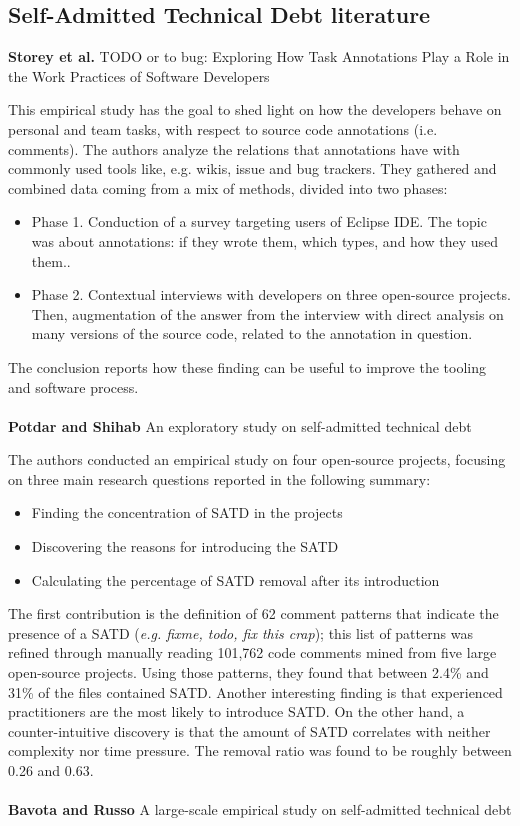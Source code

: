 \subsection{Self-Admitted Technical Debt literature}
\textbf{Storey et al.} \cite{storey2008todo} TODO or to bug: Exploring How Task Annotations Play a Role in the Work Practices of Software Developers

This empirical study has the goal to shed light on how the developers behave on personal and team tasks, with respect to source code annotations (i.e. comments).
The authors analyze the relations that annotations have with commonly used tools like, e.g. wikis, issue and bug trackers. They gathered and combined data coming from a mix of methods, divided into two phases:
\begin{itemize}
    \item Phase 1. Conduction of a survey targeting users of Eclipse IDE. The topic was about annotations: if they wrote them, which types, and how they used them..
    \item Phase 2. Contextual interviews with developers on three open-source projects. Then, augmentation of the answer from the interview with direct analysis on many versions of the source code, related to the annotation in question.
\end{itemize}

The conclusion reports how these finding can be useful to improve the tooling and software process.
\\
\\%
\textbf{Potdar and Shihab} \cite{potdar2014exploratory} An exploratory study on self-admitted technical debt

The authors conducted an empirical study on four open-source projects, focusing on three main research questions reported in the following summary:
\begin{itemize}
    \item Finding the concentration of SATD in the projects
    \item Discovering the reasons for introducing the SATD
    \item Calculating the percentage of SATD removal after its introduction
\end{itemize}

The first contribution is the definition of 62 comment patterns that indicate the presence of a SATD (\emph{e.g. fixme, todo, fix this crap}); this list of patterns was refined through manually reading 101,762 code comments mined from five large open-source projects. 
Using those patterns, they found that between 2.4\% and 31\% of the files contained SATD. Another interesting finding is that experienced practitioners are the most likely to introduce SATD. On the other hand, a counter-intuitive discovery is that the amount of SATD correlates with neither complexity nor time pressure. The removal ratio was found to be roughly between 0.26 and 0.63.
\\
\\
\textbf{Bavota and Russo} \cite{bavota2016large} A large-scale empirical study on self-admitted technical debt

